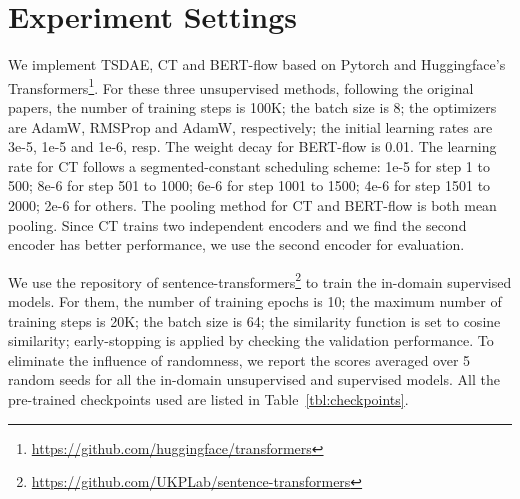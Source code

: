 \documentclass[11pt,a4paper]{article}
\begin{document}
\section{Experiment Settings}
\label{sec:experiment_settings}
We implement TSDAE, CT and BERT-flow based on Pytorch and Huggingface's Transformers\footnote{\url{https://github.com/huggingface/transformers}}. For these three unsupervised methods, following the original papers, the number of training steps is 100K; the batch size is 8; the optimizers are AdamW, RMSProp and AdamW, respectively; the initial learning rates are 3e-5, 1e-5 and 1e-6, resp. The weight decay for BERT-flow is 0.01. The learning rate for CT follows a segmented-constant scheduling scheme: 1e-5 for step 1 to 500; 8e-6 for step 501 to 1000; 6e-6 for step 1001 to 1500; 4e-6 for step 1501 to 2000; 2e-6 for others. The pooling method for CT and BERT-flow is both mean pooling. Since CT trains two independent encoders and we find the second encoder has better performance, we use the second encoder for evaluation. 

We use the repository of sentence-transformers\footnote{\url{https://github.com/UKPLab/sentence-transformers}} to train the in-domain supervised models. For them, the number of training epochs is 10; the maximum number of training steps is 20K; the batch size is 64; the similarity function  is set to cosine similarity; early-stopping is applied by checking the validation performance. To eliminate the influence of randomness, we report the scores averaged over 5 random seeds for all the in-domain unsupervised and supervised models. All the pre-trained checkpoints used are listed in Table~\ref{tbl:checkpoints}.
\end{document}
